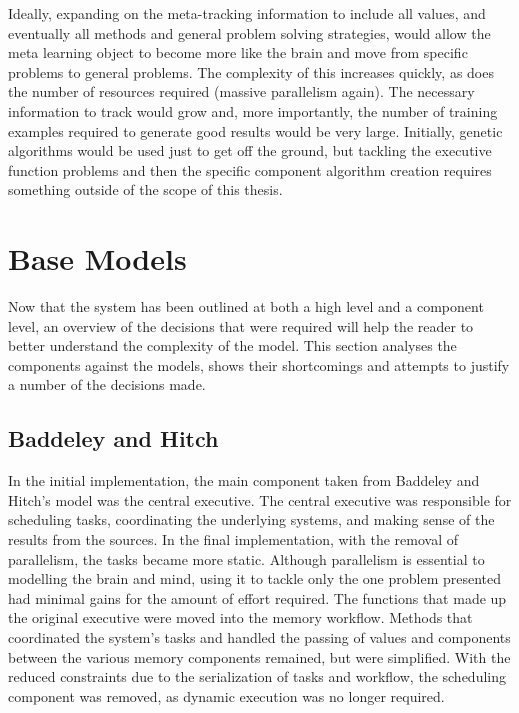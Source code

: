 Ideally, expanding on the meta-tracking information to include all values, and
eventually all methods and general problem solving strategies, would allow the
meta learning object to become more like the brain and move from specific
problems to general problems.  The complexity of this increases quickly, as does
the number of resources required (massive parallelism again). The necessary
information to track would grow and, more importantly, the number of training
examples required to generate good results would be very large.
Initially, genetic algorithms would be used just to get off the ground, but tackling the
executive function problems and then the specific component algorithm creation
requires something outside of the scope of this thesis.

\section{Base Models}

Now that the system has been outlined at both a high level and a component
level, an overview of the decisions that were required will help the reader to better
understand the complexity of the model. This section analyses the components
against the models, shows their shortcomings and attempts to justify a number
of the decisions made.

\subsection{Baddeley and Hitch}

In the initial implementation, the main component taken from Baddeley and
Hitch's model was the central executive.  The central executive was responsible
for scheduling tasks, coordinating the underlying systems, and making sense of
the results from the sources.  In the final implementation, with the removal of
parallelism, the tasks became more static.  Although parallelism is essential to 
modelling the brain and mind, using it to tackle only the one problem presented 
had minimal gains for the amount of effort required. The functions that made up the
original executive were moved into the memory workflow.  Methods that
coordinated the system's tasks and handled the passing of values and components
between the various memory components remained, but were simplified.  With the
reduced constraints due to the serialization of tasks and workflow, the
scheduling component was removed, as dynamic execution was no
longer required.

